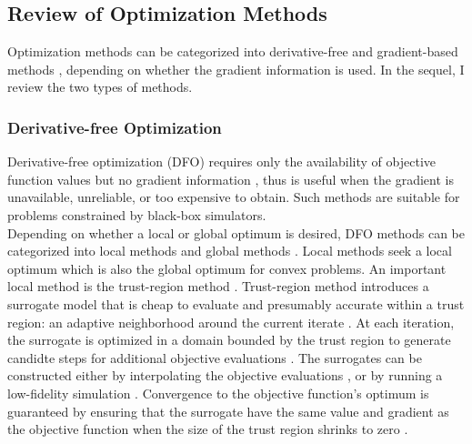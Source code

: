 \subsection{Review of Optimization Methods}
\label{sec: review optimization}
Optimization methods can be categorized into derivative-free and gradient-based methods 
\cite{gradfreereview}, depending on whether the gradient information is used. 
In the sequel, I review the two types of methods.\\
\subsubsection{Derivative-free Optimization}
\label{section: DFO}
Derivative-free optimization (DFO) requires only the availability of objective
function values but no gradient information \cite{gradfreereview}, thus is useful when the gradient
is unavailable, unreliable, or too expensive to obtain. 
Such methods are suitable for problems constrained by black-box simulators.\\

Depending on whether a local or global optimum is desired,
DFO methods can be categorized into local methods and global methods \cite{gradfreereview}.
Local methods seek a local optimum which is also the global optimum for convex problems. 
An important local method is the
trust-region method \cite{trust region review}. Trust-region method introduces a surrogate model that is
cheap to evaluate and presumably accurate within a trust region: an adaptive neighborhood around the current iterate \cite{trust region review}. 
At each iteration, the surrogate is optimized in a domain bounded by the trust region to generate
candidte steps for additional objective evaluations \cite{trust region review}.
The surrogates can be constructed either by interpolating the objective evaluations \cite{linear trust region, trustregionwild}, or by running a low-fidelity simulation \cite{MFO trust region,
Alexandrov trust region}.
Convergence to the objective function's optimum is guaranteed by ensuring that
the surrogate have the
same value and gradient as the objective function when the size of the trust region shrinks to zero
\cite{trustregionconn, trustregionwild}.\\

